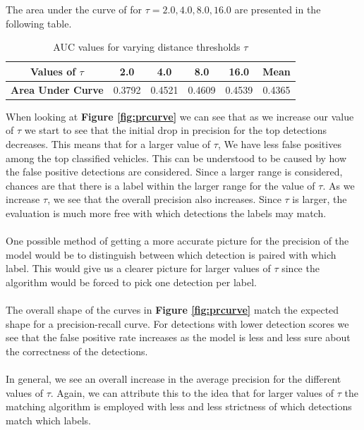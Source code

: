 \documentclass[letter]{article}
\newcommand{\fref}[1]{\textbf{Figure \ref{#1}}}
\begin{document}
	\newpage
	The area under the curve of for $\tau=2.0, 4.0, 8.0, 16.0$ are presented in the following table.
	\begin{table}[!ht]
		\centering
		\begin{tabular}{|c|c|c|c|c|c|}
		\hline
		\textbf{Values of $\tau$} & 2.0 & 4.0 & 8.0 & 16.0 & \textbf{Mean} \\ \hline
		\textbf{Area Under Curve} & 0.3792 & 0.4521 & 0.4609 & 0.4539 & 0.4365 \\ \hline
		\end{tabular}
		\caption{\label{tab:auc} AUC values for varying distance thresholds $\tau$}
	\end{table}

	When looking at \fref{fig:prcurve} we can see that as we increase our value of $\tau$ we start to see that the initial drop in precision for the top detections decreases. This means that for a larger value of $\tau$, We have less false positives among the top classified vehicles. This can be understood to be caused by how the false positive detections are considered. Since a larger range is considered, chances are that there is a label within the larger range for the value of $\tau$. As we increase $\tau$, we see that the overall precision also increases. Since $\tau$ is larger, the evaluation is much more free with which detections the labels may match.\\\\
	One possible method of getting a more accurate picture for the precision of the model would be to distinguish between which detection is paired with which label. This would give us a clearer picture for larger values of $\tau$ since the algorithm would be forced to pick one detection per label.\\\\
	The overall shape of the curves in \fref{fig:prcurve} match the expected shape for a precision-recall curve. For detections with lower detection scores we see that the false positive rate increases as the model is less and less sure about the correctness of the detections.\\\\
	In general, we see an overall increase in the average precision for the different values of $\tau$. Again, we can attribute this to the idea that for larger values of $\tau$ the matching algorithm is employed with less and less strictness of which detections match which labels.
\end{document}
